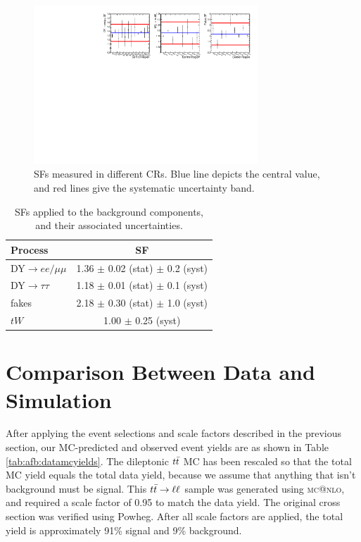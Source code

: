 \begin{figure}[t]
  \centering
  \includegraphics[width=0.75\textwidth]{figures/SFs_all.pdf}
  \caption{SFs measured in different CRs. Blue line depicts the
    central value, and red lines give the systematic uncertainty band.}
  \label{fig:afb:sfvariations}
\end{figure}

\begin{table}[h]
\begin{center}
\caption{SFs applied to the background components, and their
  associated uncertainties.}
\label{tab:afb:sfs}
{\small
\begin{tabular}{l|c}
\hline
Process & SF  \\
\hline
DY$\rightarrow ee/\mu\mu$ & 1.36 $\pm$ 0.02 (stat) $\pm$ 0.2 (syst) \\
DY$\rightarrow\tau\tau$   & 1.18 $\pm$ 0.01 (stat) $\pm$ 0.1 (syst) \\
fakes             & 2.18 $\pm$ 0.30 (stat) $\pm$ 1.0 (syst) \\
$tW$                & 1.00 $\pm$ 0.25 (syst) \\
\hline
\end{tabular}
}
\end{center}
\end{table}

\section{Comparison Between Data and Simulation}
\label{sec:afb:datamccompare}

After applying the event selections and scale factors described in the
previous section, our MC-predicted and observed event yields are as
shown in Table \ref{tab:afb:datamcyields}. The dileptonic $t\bar{t}$
MC has been rescaled so that the total MC yield equals the total data
yield, because we assume that anything that isn't background must be
signal. This $t\bar{t} \rightarrow \ell\ell$ sample was generated using \textsc{mc@nlo}, and
required a scale factor of 0.95 to match the data yield. The original
cross section was verified using Powheg. After all scale factors are applied, the
total yield is approximately 91\% signal and 9\% background.


